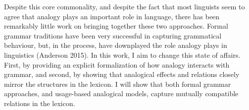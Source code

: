 {Despite this core commonality, and despite the fact that most linguists seem to agree that analogy plays an important role in language, there has been remarkably little work on bringing together these two approaches. Formal grammar traditions have been very successful in capturing grammatical behaviour, but, in the process, have downplayed the role analogy plays in linguistics (Anderson 2015). In this work, I aim to change this state of affairs. First, by providing an explicit formalization of how analogy interacts with grammar, and second, by showing that analogical effects and relations closely mirror the structures in the lexicon. I
will show that both formal grammar approaches, and usage-based analogical models, capture mutually compatible relations in the lexicon.%
}


\renewcommand{\lsID}{186} %
\renewcommand{\lsISBNdigital}{978-3-96110-186-3}
\renewcommand{\lsISBNhardcover}{978-3-96110-187-0} 
